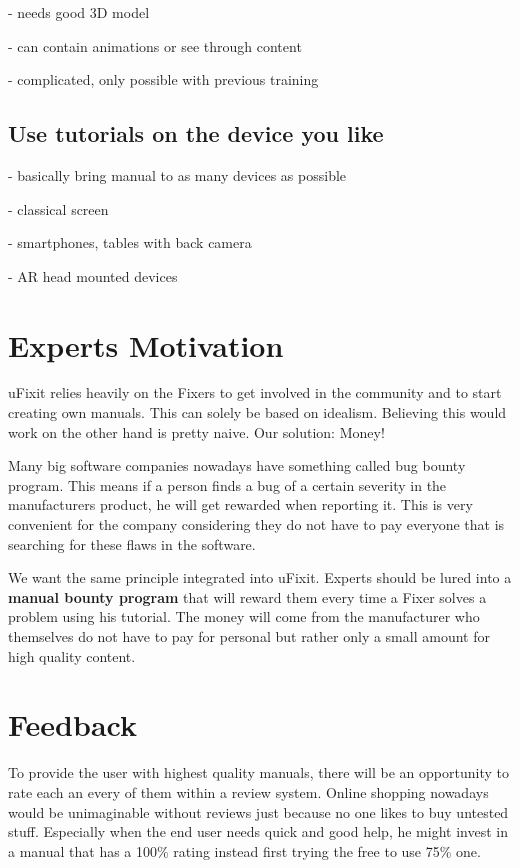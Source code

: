 			- needs good 3D model
			
			- can contain animations or see through content

			- complicated, only possible with previous training

		\subsection{Use tutorials on the device you like}
		
			- basically bring manual to as many devices as possible
			
			- classical screen
			
			- smartphones, tables with back camera
			
			- AR head mounted devices

	\section{Experts Motivation}
	
		uFixit relies heavily on the Fixers to get involved in the community and to start creating own manuals. This can solely be based on idealism. Believing this would work on the other hand is pretty naive. Our solution: Money!
		
		Many big software companies nowadays have something called bug bounty program. This means if a person finds a bug of a certain severity in the manufacturers product, he will get rewarded when reporting it. This is very convenient for the company considering they do not have to pay everyone that is searching for these flaws in the software.
		
		We want the same principle integrated into uFixit. Experts should be lured into a \textbf{manual bounty program} that will reward them every time a Fixer solves a problem using his tutorial. The money will come from the manufacturer who themselves do not have to pay for personal but rather only a small amount for high quality content.
	
	\section{Feedback}
	
		To provide the user with highest quality manuals, there will be an opportunity to rate each an every of them within a review system. Online shopping nowadays would be unimaginable without reviews just because no one likes to buy untested stuff. Especially when the end user needs quick and good help, he might invest in a manual that has a 100\% rating instead first trying the free to use 75\% one.



